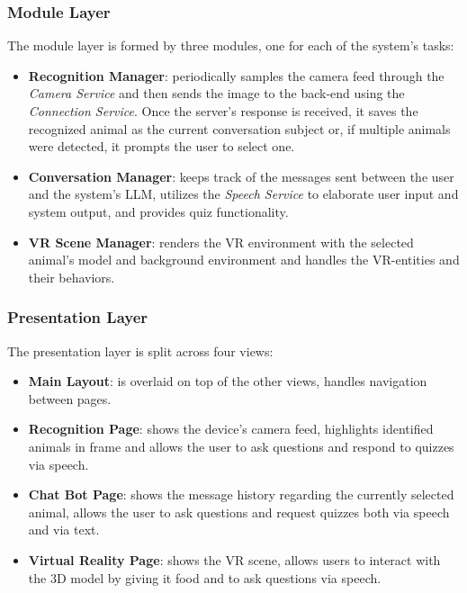 \documentclass{article}
\begin{document}
\subsubsection{Module Layer}
The module layer is formed by three modules, one for each of the system's tasks:
\begin{itemize}
    \item \textbf{Recognition Manager}: periodically samples the camera feed through the \textit{Camera Service} and then sends the image to the back-end using the \textit{Connection Service}.
    Once the server's response is received, it saves the recognized animal as the current conversation subject or, if multiple animals were detected, it prompts the user to select one.
    \item \textbf{Conversation Manager}: keeps track of the messages sent between the user and the system's LLM, utilizes the \textit{Speech Service} to elaborate user input and system output, and provides quiz functionality.
    \item \textbf{VR Scene Manager}: renders the VR environment with the selected animal's model and background environment and handles the VR-entities and their behaviors.
\end{itemize}

\subsubsection{Presentation Layer}
The presentation layer is split across four views:
\begin{itemize}
    \item \textbf{Main Layout}: is overlaid on top of the other views, handles navigation between pages.
    \item \textbf{Recognition Page}: shows the device's camera feed, highlights identified animals in frame and allows the user to ask questions and respond to quizzes via speech.
    \item \textbf{Chat Bot Page}: shows the message history regarding the currently selected animal, allows the user to ask questions and request quizzes both via speech and via text.
    \item \textbf{Virtual Reality Page}: shows the VR scene, allows users to interact with the 3D model by giving it food and to ask questions via speech.
\end{itemize}

\clearpage
\end{document}
